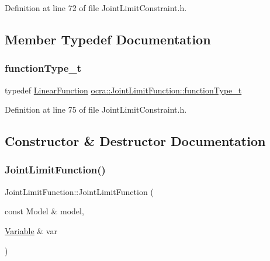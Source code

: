 Definition at line 72 of file Joint\+Limit\+Constraint.\+h.



\subsection{Member Typedef Documentation}
\hypertarget{classocra_1_1JointLimitFunction_af300f2c709840b94759c445130ec9a18}{}\label{classocra_1_1JointLimitFunction_af300f2c709840b94759c445130ec9a18} 
\subsubsection{\texorpdfstring{function\+Type\+\_\+t}{functionType\_t}}
{\footnotesize\ttfamily typedef \hyperlink{classocra_1_1LinearFunction}{Linear\+Function} \hyperlink{classocra_1_1JointLimitFunction_af300f2c709840b94759c445130ec9a18}{ocra\+::\+Joint\+Limit\+Function\+::function\+Type\+\_\+t}}



Definition at line 75 of file Joint\+Limit\+Constraint.\+h.



\subsection{Constructor \& Destructor Documentation}
\hypertarget{classocra_1_1JointLimitFunction_a00952411e7a7906fc6e5aedcfcfc6bc3}{}\label{classocra_1_1JointLimitFunction_a00952411e7a7906fc6e5aedcfcfc6bc3} 
\subsubsection{\texorpdfstring{Joint\+Limit\+Function()}{JointLimitFunction()}}
{\footnotesize\ttfamily Joint\+Limit\+Function\+::\+Joint\+Limit\+Function (\begin{DoxyParamCaption}\item[{const Model \&}]{model,  }\item[{\hyperlink{classocra_1_1Variable}{Variable} \&}]{var }\end{DoxyParamCaption})}

